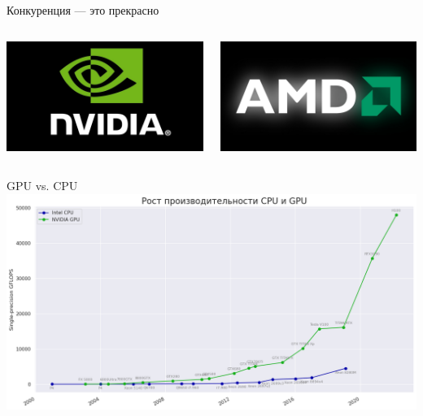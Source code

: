 \documentclass[aspectratio=169, professionalfonts]{beamer}
\begin{document}
\begin{frame}{Конкуренция --- это прекрасно}
    \begin{columns}
        \begin{column}{.49\linewidth}
            \centering
            \includegraphics[width=\linewidth]{graphs/fig31_1.jpg}
        \end{column}
        \begin{column}{.49\linewidth}
            \centering
            \includegraphics[width=\linewidth]{graphs/fig31_2.jpg}
        \end{column}
    \end{columns}
\end{frame}

\begin{frame}{GPU vs. CPU}
    \centering
    \includegraphics[width=.92\linewidth]{graphs/fig32.jpg}
\end{frame}
\end{document}
